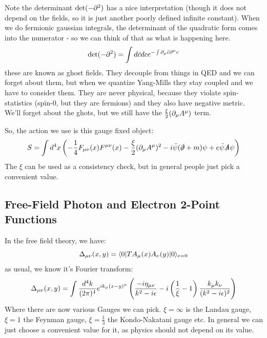 Note the determinant $\det(-\partial^2)$ has a nice interpretation (though it does not depend on the fields, so it is just another poorly defined infinite constant). When we do fermionic gaussian integrals, the determinant of the quadratic form comes into the numerator - so we can think of that as what is happening here.
\begin{equation}
    \det(-\partial^2) = \int d\bar{c}dc e^{-\int \partial_\mu \bar{c}\partial^\mu c}
\end{equation}
these are known as ghost fields. They decouple from things in QED and we can forget about them, but when we quantize Yang-Mills they stay coupled and we have to consider them. They are never physical, because they violate spin-statistics (spin-0, but they are fermions) and they also have negative metric. We'll forget about the ghots, but we still have the $\frac{\xi}{2}(\partial_\mu A^\mu)$ term.

So, the action we use is this gauge fixed object:
\begin{equation}
    S = \int d^4x \left(-\frac{1}{4}F_{\mu\nu}(x)F^{\mu\nu}(x) - \frac{\xi}{2}(\partial_\mu A^\mu)^2 - i\bar{\psi}(\slashed{\partial} + m)\psi + e\bar{\psi}\slashed{A}\psi\right)
\end{equation}
The $\xi$ can be used as a consistency check, but in general people just pick a convenient value.

\subsection{Free-Field Photon and Electron 2-Point Functions}
In the free field theory, we have:
\begin{equation}
    \Delta_{\mu\nu}(x, y) = \langle 0 \rvert TA_\mu(x)A_\nu(y)\lvert 0 \rangle_{e = 0}
\end{equation}
as usual, we know it's Fourier transform:
\begin{equation}
    \Delta_{\mu\nu}(x, y) = \int \frac{d^4k}{(2\pi)^4}e^{ik_\mu (x - y)^\mu}\left(\frac{-i\eta_{\mu\nu}}{k^2 - i\epsilon} - i\left(\frac{1}{\xi} - 1\right)\frac{k_\mu k_\nu}{(k^2 - i\epsilon)^2}\right)
\end{equation}
Where there are now various Gauges we can pick. $\xi = \infty$ is the Landau gauge, $\xi = 1$ the Feynman gauge, $\xi = \frac{1}{3}$ the Kondo-Nakatani gauge etc. In general we can just choose a convenient value for it, as physics should not depend on its value.

